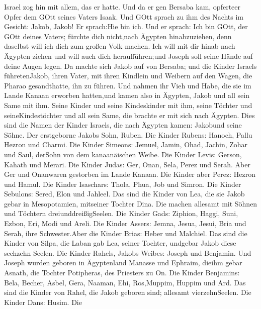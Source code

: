  Israel zog hin mit allem, das er hatte. Und da er gen
Bersaba kam, opferteer Opfer dem GOtt seines Vaters Isaak. 
Und GOtt sprach zu ihm des Nachts im Gesicht: Jakob, Jakob! Er
sprach:Hie bin ich.  Und er sprach: Ich bin GOtt, der GOtt
deines Vaters; fürchte dich nicht,nach Ägypten hinabzuziehen, denn
daselbst will ich dich zum großen Volk machen.  Ich will mit
dir hinab nach Ägypten ziehen und will auch dich heraufführen;und Joseph
soll seine Hände auf deine Augen legen.  Da machte sich
Jakob auf von Bersaba; und die Kinder Israels führetenJakob, ihren
Vater, mit ihren Kindlein und Weibern auf den Wagen, die Pharao
gesandthatte, ihn zu führen.  Und nahmen ihr Vieh und Habe,
die sie im Lande Kanaan erworben hatten,und kamen also in Ägypten, Jakob
und all sein Same mit ihm.  Seine Kinder und seine
Kindeskinder mit ihm, seine Töchter und seineKindestöchter und all sein
Same, die brachte er mit sich nach Ägypten.  Dies sind die
Namen der Kinder Israels, die nach Ägypten kamen: Jakobund seine Söhne.
Der erstgeborne Jakobs Sohn, Ruben.  Die Kinder Rubens:
Hanoch, Pallu Hezron und Charmi.  Die Kinder Simeons:
Jemuel, Jamin, Ohad, Jachin, Zohar und Saul, derSohn von dem
kanaanäischen Weibe.  Die Kinder Levis: Gerson, Kahath und
Merari.  Die Kinder Judas: Ger, Onan, Sela, Perez und
Serah. Aber Ger und Onanwaren gestorben im Lande Kanaan. Die Kinder aber
Perez: Hezron und Hamul.  Die Kinder Isaschars: Thola,
Phua, Job und Simron.  Die Kinder Sebulons: Sered, Elon und
Jahleel.  Das sind die Kinder von Lea, die sie Jakob gebar
in Mesopotamien, mitseiner Tochter Dina. Die machen allesamt mit Söhnen
und Töchtern dreiunddreißigSeelen.  Die Kinder Gads:
Ziphion, Haggi, Suni, Ezbon, Eri, Modi und Areli.  Die
Kinder Assers: Jemna, Jesua, Jesui, Bria und Serah, ihre Schwester.Aber
die Kinder Brias: Heber und Malchiel.  Das sind die Kinder
von Silpa, die Laban gab Lea, seiner Tochter, undgebar Jakob diese
sechzehn Seelen.  Die Kinder Rahels, Jakobs Weibes: Joseph
und Benjamin.  Und Joseph wurden geboren in Ägyptenland
Manasse und Ephraim, dieihm gebar Asnath, die Tochter Potipheras, des
Priesters zu On.  Die Kinder Benjamins: Bela, Becher,
Asbel, Gera, Naaman, Ehi, Ros,Muppim, Huppim und Ard.  Das
sind die Kinder von Rahel, die Jakob geboren sind; allesamt
vierzehnSeelen.  Die Kinder Dans: Husim.  Die
